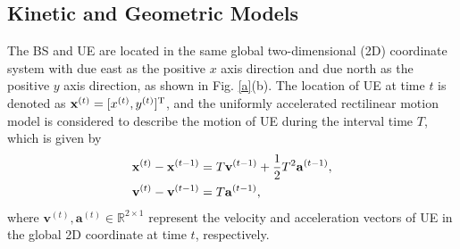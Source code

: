 \documentclass[journal,12pt,onecolumn,draftclsnofoot,]{IEEEtran}
\begin{document}
\subsection{Kinetic and Geometric Models}
\vspace{-1.5mm}
The BS and UE are located in the same global two-dimensional (2D) coordinate system with due east as the positive $x$ axis direction and due north as the positive $y$ axis direction, as shown in Fig. \ref{a}(b). The location of UE at time $t$ is denoted as ${\mathbf{x}^{({{t}} )}} = {[ {{x^{({{t}} )}},{y^{(t )}}} ]^{\rm T}}$, and the uniformly accelerated rectilinear motion model is considered to describe the motion of UE during the interval time ${T}$, which is given by
\begin{subequations}
\vspace{-2mm}
\begin{align}
{\mathbf{x}^{\left({t} \right)}} - {\mathbf{x}^{\left({{t} - 1} \right)}} &= {T}{\mathbf{v}^{\left({t - 1} \right)}} + \frac{1}{2}{{T}^2}{\mathbf{a}^{\left({t - 1} \right)}}, \\
{\mathbf{v}^{\left(t \right)}} - {\mathbf{v}^{\left({t - 1} \right)}} &= {T}{\mathbf{a}^{\left({t - 1} \right)}},
\end{align}

\end{subequations}
\noindent where ${\mathbf{v}^{({t} )}},{\mathbf{a}^{({t} )}} \in {\mathbb{R}^{2\times 1}}$ represent the velocity and acceleration vectors of UE in the global 2D coordinate at time $t$, respectively. 
\end{document}
